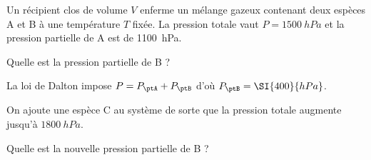 
\finEntrainement







\hauteurLargeurCadreReponse		{5mm}{3cm}
\typeEntrainement				{} %
\initialisationEntrainement

Un récipient clos de volume $V$ enferme un mélange gazeux contenant deux espèces A et B à une température $T$ fixée. La pression totale vaut $P=\SI{1500}{hPa}$ et la pression partielle de A est de \SI{1100}{hPa}.
\debutEntrainement

\begin{enonce}
 Quelle est la pression partielle de B ? 
\end{enonce}


\begin{corrige}
La loi de Dalton impose $P=P_\ptA+P_\ptB$ d'où $P_\ptB=\SI{400}{hPa}$.
\end{corrige}


\begin{enonce}
On ajoute une espèce C au système de sorte que la pression totale augmente jusqu'à $\SI {1800}{hPa} $. \par
Quelle est la nouvelle pression partielle de B ?
\end{enonce}

